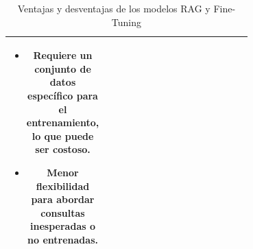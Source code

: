 \begin{table}[ht]
\begin{tabular}{|c|p{0.35\linewidth}|p{0.35\linewidth}|}
\begin{raggedright}
\begin{itemize}
            \item Requiere un conjunto de datos específico para el entrenamiento, lo que puede ser costoso.
            \item Menor flexibilidad para abordar consultas inesperadas o no entrenadas.
        \end{itemize} 
        \end{raggedright} \\
        \hline
    \end{tabular}
    \caption{Ventajas y desventajas de los modelos RAG y Fine-Tuning}
    \label{tab:rag_vs_finetuning}
\end{table}











